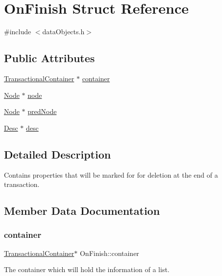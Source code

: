 \hypertarget{structOnFinish}{}\section{On\+Finish Struct Reference}
\label{structOnFinish}


{\ttfamily \#include $<$data\+Objects.\+h$>$}

\subsection*{Public Attributes}
\begin{DoxyCompactItemize}
\item 
\hyperlink{classTransactionalContainer}{Transactional\+Container} $\ast$ \hyperlink{structOnFinish_a6a431dc3315256256950a122a336eca2}{container}
\item 
\hyperlink{structNode}{Node} $\ast$ \hyperlink{structOnFinish_a09176017b5eb8bfe93aefac9ec274afd}{node}
\item 
\hyperlink{structNode}{Node} $\ast$ \hyperlink{structOnFinish_ab5009de05956749c669b9a65952296d3}{pred\+Node}
\item 
\hyperlink{structDesc}{Desc} $\ast$ \hyperlink{structOnFinish_a5d8dd120e6974a5ff2285e5240d4f286}{desc}
\end{DoxyCompactItemize}


\subsection{Detailed Description}
Contains properties that will be marked for for deletion at the end of a transaction. 

\subsection{Member Data Documentation}
\mbox{\label{structOnFinish_a6a431dc3315256256950a122a336eca2}} 
\subsubsection{\texorpdfstring{container}{container}}
{\footnotesize\ttfamily \hyperlink{classTransactionalContainer}{Transactional\+Container}$\ast$ On\+Finish\+::container}

The container which will hold the information of a list. \mbox{\label{structOnFinish_a5d8dd120e6974a5ff2285e5240d4f286}} 

